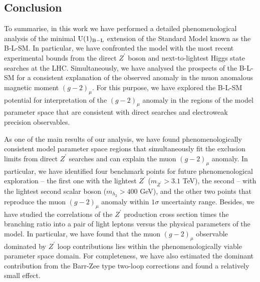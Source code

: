 \subsection{Conclusion}
\label{sec:Conclusions}

To summarise, in this work we have performed a detailed phenomenological analysis of the
minimal $\mathrm{U}(1)_{\mathrm{B-L}}$ extension of the Standard Model known as the B-L-SM. In particular, 
we have confronted the model with the most recent experimental bounds from the direct 
$Z^\prime$ boson and next-to-lightest Higgs state searches at the LHC. Simultaneously, 
we have analysed the prospects of the B-L-SM for a consistent explanation 
of the observed anomaly in the muon anomalous magnetic moment $(g-2)_{\mu}$. 
For this purpose, we have explored the B-L-SM potential for interpretation of the $(g-2)_{\mu}$ anomaly in the regions of the model parameter space that 
are consistent with direct searches and electroweak precision observables.

As one of the main results of our analysis, we have found phenomenologically consistent model parameter space regions that simultaneously fit the exclusion limits from direct $Z^\prime$ searches and can explain the muon $(g-2)_{\mu}$ anomaly. In particular, we have identified four benchmark points for future phenomenological exploration -- the first one with the lightest $Z^\prime$ ($m_{Z^\prime}>3.1$ TeV), the second -- with the lightest second scalar boson ($m_{h_2}>400$ GeV), and the other two points that reproduce the muon $(g-2)_{\mu}$ anomaly within $1\sigma$ uncertainty range. Besides, we have studied the correlations of the $Z^\prime$ production cross section times the branching ratio into a pair of light leptons versus the physical parameters of the model. In particular, we have found that the muon $(g-2)_{\mu}$ observable dominated by $Z^\prime$ loop contributions lies within the phenomenologically viable parameter space domain. For completeness, we have also estimated the dominant contribution from the Barr-Zee type two-loop corrections and found a relatively small effect.
